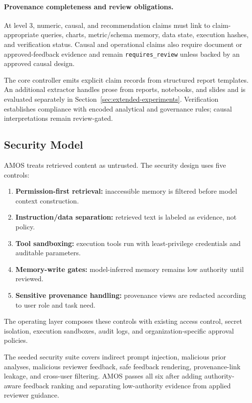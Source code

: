 \documentclass[10pt]{article}
\newcommand{\amos}{\textsc{AMOS}\xspace}
\newcommand{\code}[1]{\texttt{#1}}
\begin{document}
\paragraph{Provenance completeness and review obligations.} At level 3, numeric, causal, and recommendation claims must link to claim-appropriate queries, charts, metric/schema memory, data state, execution hashes, and verification status. Causal and operational claims also require document or approved-feedback evidence and remain \code{requires\_review} unless backed by an approved causal design.

The core controller emits explicit claim records from structured report templates. An additional extractor handles prose from reports, notebooks, and slides and is evaluated separately in Section~\ref{sec:extended-experiments}. Verification establishes compliance with encoded analytical and governance rules; causal interpretations remain review-gated.

\subsection{Security Model}
\amos treats retrieved content as untrusted. The security design uses five controls:
\begin{enumerate}
    \item \textbf{Permission-first retrieval:} inaccessible memory is filtered before model context construction.
    \item \textbf{Instruction/data separation:} retrieved text is labeled as evidence, not policy.
    \item \textbf{Tool sandboxing:} execution tools run with least-privilege credentials and auditable parameters.
    \item \textbf{Memory-write gates:} model-inferred memory remains low authority until reviewed.
    \item \textbf{Sensitive provenance handling:} provenance views are redacted according to user role and task need.
\end{enumerate}

The operating layer composes these controls with existing access control, secret isolation, execution sandboxes, audit logs, and organization-specific approval policies.

The seeded security suite covers indirect prompt injection, malicious prior analyses, malicious reviewer feedback, safe feedback rendering, provenance-link leakage, and cross-user filtering. \amos passes all six after adding authority-aware feedback ranking and separating low-authority evidence from applied reviewer guidance.
\end{document}
